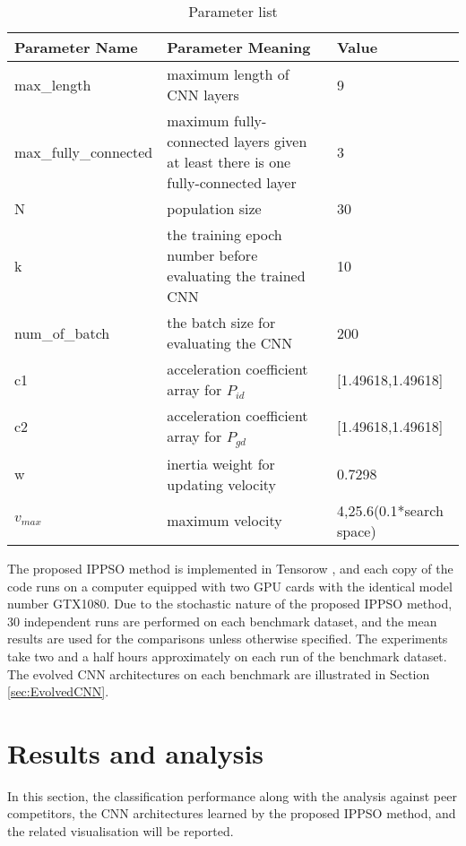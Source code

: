 \documentclass[conference]{IEEEtran}
\begin{document}
\begin{table}[!t]
	\renewcommand{\arraystretch}{1.3}
	\caption{Parameter list}
	\label{table:ParameterList}
	\centering
	\begin{tabular}{|p{2.5cm}|p{3cm}|p{2cm}|}
		\hline
		Parameter Name & Parameter Meaning & Value\\
		\hline
		max\_length & maximum length of CNN layers & 9\\
		\hline
		max\_fully\_connected & maximum fully-connected layers given at least there is one fully-connected layer & 3\\
		\hline
		N & population size & 30\\
		\hline
		k & the training epoch number before evaluating the trained CNN & 10\\
		\hline
		num\_of\_batch & the batch size for evaluating the CNN & 200\\
		\hline
		c1 & acceleration coefficient array for $P_{id}$ & [1.49618,1.49618]\\
		\hline
		c2 & acceleration coefficient array for $P_{gd}$ & [1.49618,1.49618]\\
		\hline
		w & inertia weight for updating velocity & 0.7298\\
		\hline
		$v_{max}$ & maximum velocity & 4,25.6(0.1*search space)\\
		\hline
	\end{tabular}
\end{table}

The proposed IPPSO method is implemented in Tensorow \cite{Tensorfow:Abadi}, and each copy of the code runs on a computer equipped with two GPU cards with the identical model number GTX1080. Due to the stochastic nature of the proposed IPPSO method, 30 independent runs are performed on each benchmark dataset, and the mean results are used for the comparisons unless otherwise specified. The experiments take two and a half hours approximately on each run of the benchmark dataset.
The evolved CNN architectures on each benchmark are illustrated in Section \ref{sec:EvolvedCNN}.


\section{Results and analysis}\label{sec:EPResults}

In this section, the classification performance along with the analysis against peer competitors, the CNN architectures learned by the proposed IPPSO method, and the related visualisation will be reported.
\end{document}

